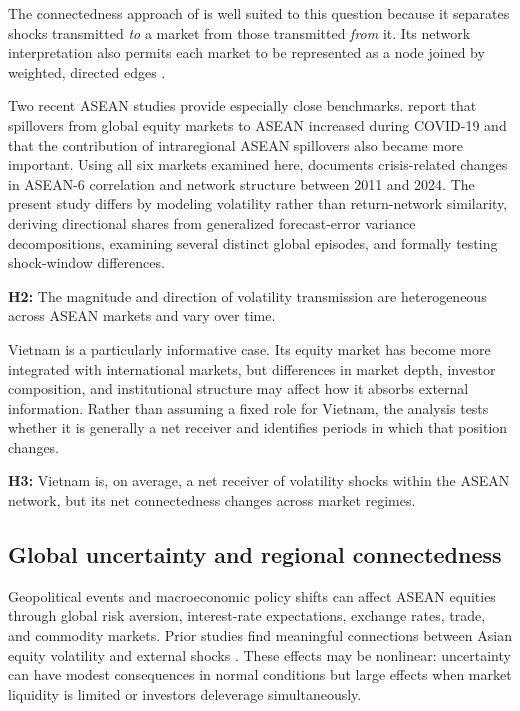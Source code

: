 \documentclass[12pt,a4paper]{article}
\begin{document}
The connectedness approach of \citet{DieboldYilmaz2012} is well suited to this question because it separates shocks transmitted \emph{to} a market from those transmitted \emph{from} it. Its network interpretation also permits each market to be represented as a node joined by weighted, directed edges \citep{DieboldYilmaz2014}.

Two recent ASEAN studies provide especially close benchmarks. \citet{SethapramoteEtAl2023} report that spillovers from global equity markets to ASEAN increased during COVID-19 and that the contribution of intraregional ASEAN spillovers also became more important. Using all six markets examined here, \citet{AlAnshari2025} documents crisis-related changes in ASEAN-6 correlation and network structure between 2011 and 2024. The present study differs by modeling volatility rather than return-network similarity, deriving directional shares from generalized forecast-error variance decompositions, examining several distinct global episodes, and formally testing shock-window differences.

\textbf{H2:} The magnitude and direction of volatility transmission are heterogeneous across ASEAN markets and vary over time.

Vietnam is a particularly informative case. Its equity market has become more integrated with international markets, but differences in market depth, investor composition, and institutional structure may affect how it absorbs external information. Rather than assuming a fixed role for Vietnam, the analysis tests whether it is generally a net receiver and identifies periods in which that position changes.

\textbf{H3:} Vietnam is, on average, a net receiver of volatility shocks within the ASEAN network, but its net connectedness changes across market regimes.

\subsection{Global uncertainty and regional connectedness}

Geopolitical events and macroeconomic policy shifts can affect ASEAN equities through global risk aversion, interest-rate expectations, exchange rates, trade, and commodity markets. Prior studies find meaningful connections between Asian equity volatility and external shocks \citep{Chow2017,VoTran2020}. These effects may be nonlinear: uncertainty can have modest consequences in normal conditions but large effects when market liquidity is limited or investors deleverage simultaneously.
\end{document}

